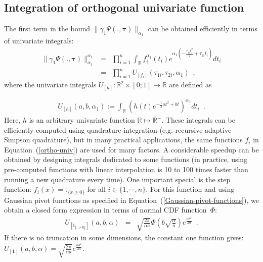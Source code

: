 \documentclass[reqno,oneside,letterpaper,10pt]{article}
\renewcommand{\t}{\mathbf{t}}
\newcommand{\diag}[1]{\mathop{\textrm{diag}}\left(#1\right)}
\newcommand{\transp}{^{T}}
\newcommand{\unigint}[1]{{U}_{\left[#1\right]}}
\def\Indic#1{\mathbb{I}_{\{#1\}}}
\def\u{\mathbf{u}}
\def\btau{{\bm{\tau}}}
\renewcommand{\Re}{\mathbb{R}}
\begin{document}
\subsection{Integration of orthogonal univariate function}
\label{sec:univ-integral}
The first term in the bound $\|\gamma_1\Psi(.,\btau)\|_{\alpha_1}$ can be obtained 
efficiently in terms of univariate integrals:
\begin{eqnarray} 
\|\gamma_1\Psi(.,\btau)\|_{\alpha_1}^{\alpha_1}
&=&
\prod_{i=1}^n
\int_\Re f_i^{\alpha_1}(t_i)
e^{\alpha_1(-\frac{\tau_{1i} t_i^2}2 + \tau_{2i} t_i)}
dt_i
\nonumber\\
&=&
\prod_{i=1}^n
\unigint{f_i}\left(\tau_{1i},\tau_{2i},\alpha_1\right)
\enspace,
\label{ortho-univ}
\end{eqnarray}
where the univariate integrals $\unigint{h}:\Re^2\times [0;1]\mapsto\Re$ are defined as

\begin{eqnarray} 
\unigint{h}(a,b,\alpha_1):=\int_\Re \left(h(t)e^{-\frac 12 a t^2 + b t}\right)^{\alpha_1} dt_i
\enspace.
\end{eqnarray} 
Here, $h$ is an arbitrary univariate function $\Re\mapsto\Re^+$. These integrals
can be efficiently computed using quadrature integration (e.g. recursive
adaptive Simpson quadrature), but in many practical applications, the same
functions $f_i$ in Equation~(\ref{ortho-univ}) are used for many factors. A considerable speedup can be obtained
by designing integrals dedicated to some functions (in practice, using pre-computed functions with linear interpolation 
 is 10 to 100 times faster than running a new quadrature every time). One important special is the step function:
$f_i(x)=\Indic{x\ge 0}$ for all $i\in\{1,\cdots,n\}$.
For this function and using Gaussian pivot functions as specified in Equation~(\ref{Gaussian-pivot-functions}), we obtain a closed form expression in terms of normal CDF function~$\Phi$:			
\begin{eqnarray}
		\unigint{\Indic{\cdot\ge0}}(a,b,\alpha) 
		&		=		&
		\sqrt{\frac{2\pi}{\alpha a}} 
		  \Phi\left(b \sqrt{\frac{\alpha}{a}}\right)
e^{\frac{\alpha b^2}{2 a}}
\enspace.
\end{eqnarray}	
If there is no truncation in some dimensions, the constant one function gives:
$\unigint{\bm{1}}(a,b,\alpha) =\sqrt{\frac{2\pi}{\alpha a}} e^{\frac{\alpha b^2}{2 a}}.$
\end{document}

